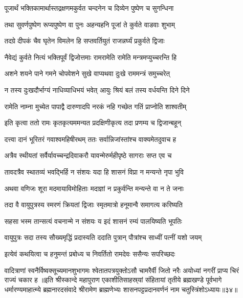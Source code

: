 \twolineshloka
{पूजार्थं भक्तिकामार्थास्तद्रक्षणमकुर्वत}
{चन्दनेन च दिव्येन पुष्पेण च सुगन्धिना}%

\twolineshloka
{तथा सुवर्णपुष्पेण रूप्यपुष्पेण वा पुनः}
{अहन्यहनि पूजां ते कुर्वते वाडवाः शुभाम्}%

\twolineshloka
{तदग्रे दीपकं चैव घृतेन विमलेन हि}
{सप्तवर्तियुतं राजन्नर्घ्यं प्रकुर्वते द्विजाः}%

\twolineshloka
{नैवेद्यं कुर्वते नित्यं भक्तिपूर्वं द्विजोत्तमाः}
{रामरामेति रामेति मन्त्रमप्युच्चरन्ति हि}%

\twolineshloka
{अशने शयने पाने गमने चोपवेशने}
{सुखे वाप्यथवा दुःखे राममन्त्रं समुच्चरेत्}%

\twolineshloka
{न तस्य दुःखदौर्भाग्यं नाधिव्याधिभयं भवेत्}
{आयुः श्रियं बलं तस्य वर्धयन्ति दिने दिने}%

\twolineshloka
{रामेति नाम्ना मुच्येत पापाद्वै दारुणादपि}
{नरकं नहि गच्छेत गतिं प्राप्नोति शाश्वतीम्}%


\twolineshloka
{इति कृत्वा ततो रामः कृतकृत्यममन्यत}
{प्रदक्षिणीकृत्य तदा प्रणम्य च द्विजान्बहून्}%

\twolineshloka
{दत्त्वा दानं भूरितरं गवाश्वमहिषीरथम्}
{ततः सर्वान्निजांस्तांश्च वाक्यमेतदुवाच ह}%

\twolineshloka
{अत्रैव स्थीयतां सर्वैर्यावच्चन्द्रदिवाकरौ}
{यावन्मेरुर्महीपृष्ठे सागराः सप्त एव च}%

\twolineshloka
{तावदत्रैव स्थातव्यं भवद्भिर्हि न संशयः}
{यदा हि शासनं विप्रा न मन्यन्ते नृपा भुवि}%

\twolineshloka
{अथवा वणिजः शूरा मदमायाविमोहिताः}
{मदाज्ञां न प्रकुर्वन्ति मन्यन्ते वा न ते जनाः}%

\twolineshloka
{तदा वै वायुपुत्रस्य स्मरणं क्रियतां द्विजाः}
{स्मृतमात्रो हनूमान्वै समागत्य करिष्यति}%

\twolineshloka
{सहसा भस्म तान्सत्यं वचनान्मे न संशयः}
{य इदं शासनं रम्यं पालयिष्यति भूपतिः}%

\twolineshloka
{वायुपुत्रः सदा तस्य सौख्यमृद्धिं प्रदास्यति}
{ददाति पुत्रान् पौत्रांश्च साध्वीं पत्नीं यशो जयम्}%

\twolineshloka
{इत्येवं कथयित्वा च हनुमन्तं प्रबोध्य च}
{निवर्तितो रामदेवः ससैन्यः सपरिच्छदः}%

\threelineshloka
{वादित्राणां स्वनैर्विष्वक्सूच्यमानशुभागमः}
{श्वेतातपत्रयुक्तोऽसौ चामरैर्वी जितो नरैः}
{अयोध्यां नगरीं प्राप्य चिरं राज्यं चकार ह}%
॥इति श्रीस्कान्दे महापुराण एकाशीतिसाहस्र्यां संहितायां तृतीये ब्रह्मखण्डे पूर्वभागे धर्मारण्यमाहात्म्ये ब्रह्मनारदसंवादे श्रीरामेण ब्राह्मणेभ्यः शासनपट्टप्रदानवर्णनं नाम चतुस्त्रिंशोऽध्यायः॥३४॥

